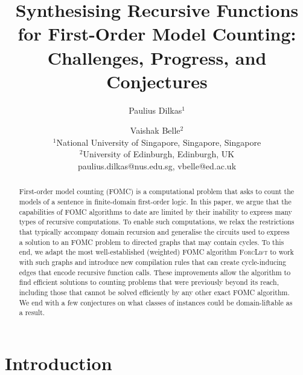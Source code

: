 \documentclass{article}
\title{Synthesising Recursive Functions for First-Order Model Counting:\\
  Challenges, Progress, and Conjectures}
\author{%
Paulius Dilkas$^1$\and
Vaishak Belle$^2$\\
\affiliations
$^1$National University of Singapore, Singapore, Singapore\\
$^2$University of Edinburgh, Edinburgh, UK\\
\emails
paulius.dilkas@nus.edu.sg,
vbelle@ed.ac.uk
}
\begin{document}
\maketitle

\begin{abstract}
  First-order model counting (FOMC) is a computational problem that asks to
  count the models of a sentence in finite-domain first-order logic. In this
  paper, we argue that the capabilities of FOMC algorithms to date are limited
  by their inability to express many types of recursive computations. To enable
  such computations, we relax the restrictions that typically accompany domain
  recursion and generalise the circuits used to express a solution to an FOMC
  problem to directed graphs that may contain cycles. To this end, we adapt the
  most well-established (weighted) FOMC algorithm \textsc{ForcLift} to work with
  such graphs and introduce new compilation rules that can create cycle-inducing
  edges that encode recursive function calls. These improvements allow the
  algorithm to find efficient solutions to counting problems that were
  previously beyond its reach, including those that cannot be solved efficiently
  by any other exact FOMC algorithm. We end with a few conjectures on what
  classes of instances could be domain-liftable as a result.
\end{abstract}

\section{Introduction}\label{sec:introduction}
\end{document}
